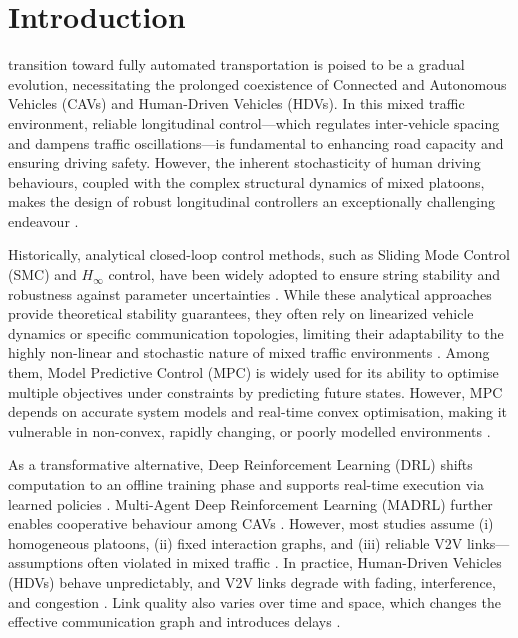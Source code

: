 \documentclass{ieeeaccess}
\begin{document}
\titlepgskip=-15pt

\maketitle

\section{Introduction}
\label{sec:introduction}

 transition toward fully automated transportation is poised to be a gradual evolution, necessitating the prolonged coexistence of Connected and Autonomous Vehicles (CAVs) and Human-Driven Vehicles (HDVs).
In this mixed traffic environment, reliable longitudinal control—which regulates inter-vehicle spacing and dampens traffic oscillations—is fundamental to enhancing road capacity and ensuring driving safety. However, the inherent stochasticity of human driving behaviours, coupled with the complex structural dynamics of mixed platoons, makes the design of robust longitudinal controllers an exceptionally challenging endeavour \cite{7995716, 11152633}.

Historically, analytical closed-loop control methods, such as Sliding Mode Control (SMC) and $H_\infty$ control, have been widely adopted to ensure string stability and robustness against parameter uncertainties \cite{7446290, 6683051}. While these analytical approaches provide theoretical stability guarantees, they often rely on linearized vehicle dynamics or specific communication topologies, limiting their adaptability to the highly non-linear and stochastic nature of mixed traffic environments \cite{7225700}. Among them, Model Predictive Control (MPC) is widely used for its ability to optimise multiple objectives under constraints by predicting future states. However, MPC depends on accurate system models and real-time convex optimisation, making it vulnerable in non-convex, rapidly changing, or poorly modelled environments \cite{Rawlings2009}.

As a transformative alternative, Deep Reinforcement Learning (DRL) shifts computation to an offline training phase and supports real-time execution via learned policies \cite{Kiran2022_Survey}. Multi-Agent Deep Reinforcement Learning (MADRL) further enables cooperative behaviour among CAVs \cite{iqbal2021coordinatedexplorationintrinsicrewards}. However, most studies assume (i) homogeneous platoons, (ii) fixed interaction graphs, and (iii) reliable V2V links—assumptions often violated in mixed traffic \cite{9565068}. In practice, Human-Driven Vehicles (HDVs) behave unpredictably, and V2V links degrade with fading, interference, and congestion \cite{Zhao2021}. Link quality also varies over time and space, which changes the effective communication graph and introduces delays \cite{9565068}.
\end{document}
